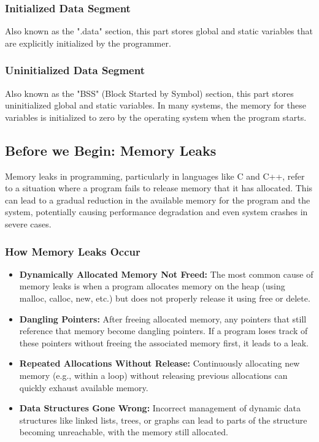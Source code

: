 \documentclass{report}
\begin{document}
\begin{concept}
    \subsubsection{Initialized Data Segment}
    \bigbreak \noindent 
    Also known as the ".data" section, this part stores global and static variables that are explicitly initialized by the programmer.
    
    \bigbreak \noindent 
    \subsubsection{Uninitialized Data Segment}
    \bigbreak \noindent 
    Also known as the "BSS" (Block Started by Symbol) section, this part stores uninitialized global and static variables. In many systems, the memory for these variables is initialized to zero by the operating system when the program starts.

    \pagebreak 
    \bigbreak \noindent 
    \subsection{Before we Begin: Memory Leaks}
    \bigbreak \noindent 
    \begin{concept}
    Memory leaks in programming, particularly in languages like C and C++, refer to a situation where a program fails to release memory that it has allocated. This can lead to a gradual reduction in the available memory for the program and the system, potentially causing performance degradation and even system crashes in severe cases.

    \end{concept}
    \bigbreak \noindent 
    \subsubsection{How Memory Leaks Occur}
    \begin{itemize}
        \item \textbf{Dynamically Allocated Memory Not Freed:} The most common cause of memory leaks is when a program allocates memory on the heap (using malloc, calloc, new, etc.) but does not properly release it using free or delete.
        \item \textbf{Dangling Pointers:} After freeing allocated memory, any pointers that still reference that memory become dangling pointers. If a program loses track of these pointers without freeing the associated memory first, it leads to a leak.
        \item \textbf{Repeated Allocations Without Release:} Continuously allocating new memory (e.g., within a loop) without releasing previous allocations can quickly exhaust available memory.
        \item \textbf{Data Structures Gone Wrong:} Incorrect management of dynamic data structures like linked lists, trees, or graphs can lead to parts of the structure becoming unreachable, with the memory still allocated.
    \end{itemize}
    

\end{concept}
\end{document}

